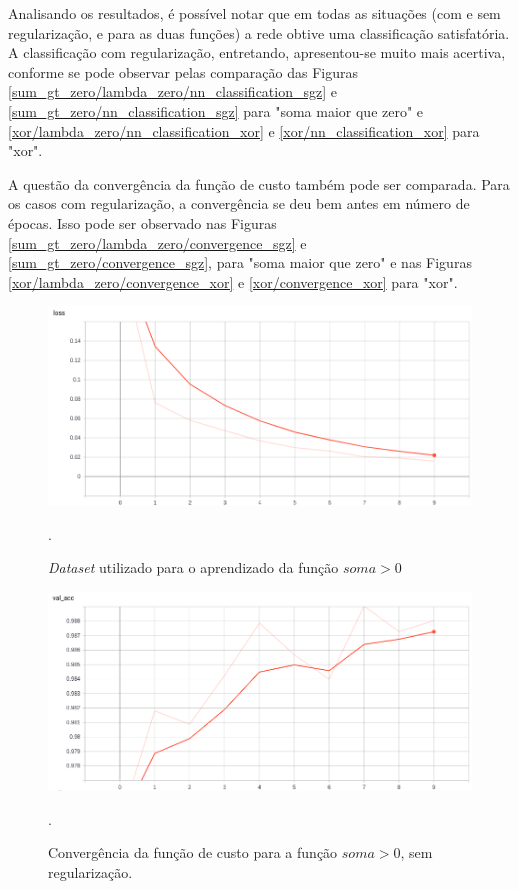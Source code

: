 \documentclass[conference]{IEEEtran}
\begin{document}
Analisando os resultados, é possível notar que em todas as situações (com e sem regularização, e para as duas funções) a rede obtive uma classificação satisfatória. A classificação com regularização, entretando, apresentou-se muito mais acertiva, conforme se pode observar pelas comparação das Figuras \ref{sum_gt_zero/lambda_zero/nn_classification_sgz} e \ref{sum_gt_zero/nn_classification_sgz} para "soma maior que zero" e \ref{xor/lambda_zero/nn_classification_xor} e \ref{xor/nn_classification_xor} para "xor". 

A questão da convergência da função de custo também pode ser comparada. Para os casos com regularização, a convergência se deu bem antes em número de épocas. Isso pode ser observado nas Figuras \ref{sum_gt_zero/lambda_zero/convergence_sgz} e \ref{sum_gt_zero/convergence_sgz}, para "soma maior que zero" e nas Figuras \ref{xor/lambda_zero/convergence_xor} e \ref{xor/convergence_xor} para "xor". 

\begin{figure}[htbp]
\centering
\centerline{\includegraphics[scale=0.25]{imagens/loss.png}}
\caption{\textit{Dataset} utilizado para o aprendizado da função $soma > 0$}.
\label{loss}
\end{figure}

\begin{figure}[htbp]
\centering
\centerline{\includegraphics[scale=0.25]{imagens/val_acc.png}}
\caption{Convergência da função de custo para a função $soma > 0$, sem regularização.}.
\label{val_acc}
\end{figure}
\end{document}
